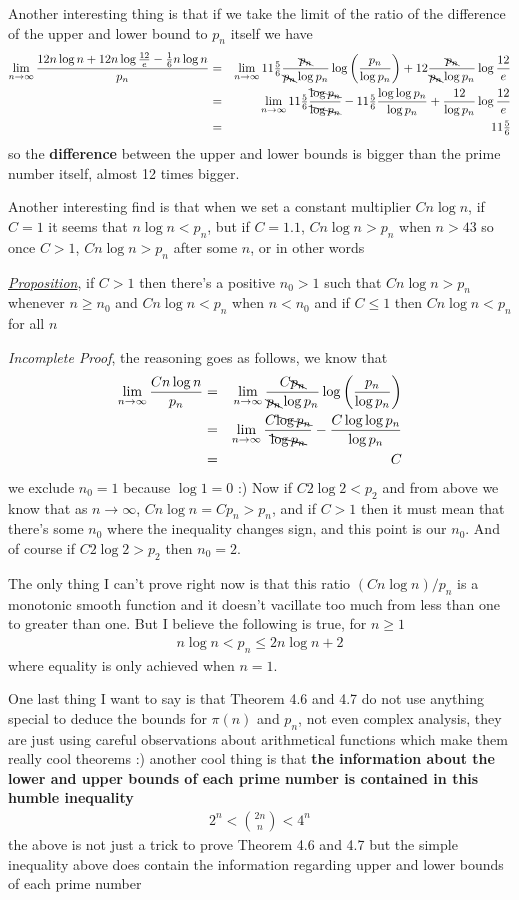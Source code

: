 \documentclass[aps,preprint,preprintnumbers,nofootinbib,showpacs,prd]{revtex4-1}
\newcommand{\nbea}{\begin{eqnarray*}}
\newcommand{\neea}{\end{eqnarray*}}
\begin{document}
Another interesting thing is that if we take the limit of the ratio of the difference of the upper and lower bound to $p_n$ itself we have
%
\nbea
\lim_{n\to\infty} \frac{12 n \log n + 12 n \log\frac{12}{e} - \tfrac{1}{6} n \log n}{p_n} & = & \lim_{n\to\infty} 11\tfrac{5}{6} \frac{\bcancel{p_n}}{\bcancel{p_n}\log p_n} \log \left ( \frac{p_n}{\log p_n}\right ) + 12 \frac{\bcancel{p_n}}{\bcancel{p_n}\log p_n} \log\frac{12}{e} \\
& = & \lim_{n\to\infty} 11\tfrac{5}{6} \frac{\bcancel{\log p_n}}{\bcancel{\log p_n}} - 11\tfrac{5}{6} \frac{\log \log p_n}{\log p_n} + \frac{12}{\log p_n} \log\frac{12}{e} \\
& = & 11\tfrac{5}{6}
\neea
%
so the {\bf difference} between the upper and lower bounds is bigger than the prime number itself, almost 12 times bigger.

Another interesting find is that when we set a constant multiplier $C n\log n$, if $C = 1$ it seems that $n\log n < p_n$, but if $C=1.1$, $C n \log n > p_n$ when $n > 43$ so once $C > 1$, $Cn\log n > p_n$ after some $n$, or in other words

\underline{\textit {Proposition}}, if $C > 1$ then there's a positive $n_0 > 1$ such that $Cn\log n > p_n$ whenever $n \ge n_0$ and $Cn\log n < p_n$ when $n < n_0$ and if $C\le1$ then $C n\log n < p_n$ for all $n$

{\it Incomplete Proof}, the reasoning goes as follows, we know that
%
\nbea
\lim_{n\to\infty}\frac{Cn\log n}{p_n} & = &  \lim_{n\to\infty} \frac{C \bcancel{p_n}}{\bcancel{p_n}\log p_n} \log \left ( \frac{p_n}{\log p_n}\right ) \\
& = & \lim_{n\to\infty} \frac{C \bcancel{\log p_n}}{\bcancel{\log p_n}} - \frac{C \log \log p_n}{\log p_n} \\
& = & C
\neea
%
we exclude $n_0 = 1$ because $\log 1 = 0$ :) Now if $C 2 \log 2 < p_2$ and from above we know that as $n\to\infty$, $Cn\log n = C p_n > p_n$, and if $C > 1$ then it must mean that there's some $n_0$ where the inequality changes sign, and this point is our $n_0$. And of course if $C2 \log 2 > p_2$ then $n_0 = 2$.

The only thing I can't prove right now is that this ratio $(Cn\log n)/p_n$ is a monotonic smooth function and it doesn't vacillate too much from less than one to greater than one. But I believe the following is true, for $n \ge 1$
%
\nbea
n\log n < p_n \le 2n\log n + 2
\neea
%
where equality is only achieved when $n=1$.

One last thing I want to say is that Theorem 4.6 and 4.7 do not use anything special to deduce the bounds for $\pi(n)$ and $p_n$, not even complex analysis, they are just using careful observations about arithmetical functions which make them really cool theorems :)  another cool thing is that {\bf the information about the lower and upper bounds of each prime number is contained in this humble inequality}
%
\nbea
2^n < {2n \choose n} < 4^n
\neea
%
the above is not just a trick to prove Theorem 4.6 and 4.7 but the simple inequality above does contain the information regarding upper and lower bounds of each prime number
\end{document}
